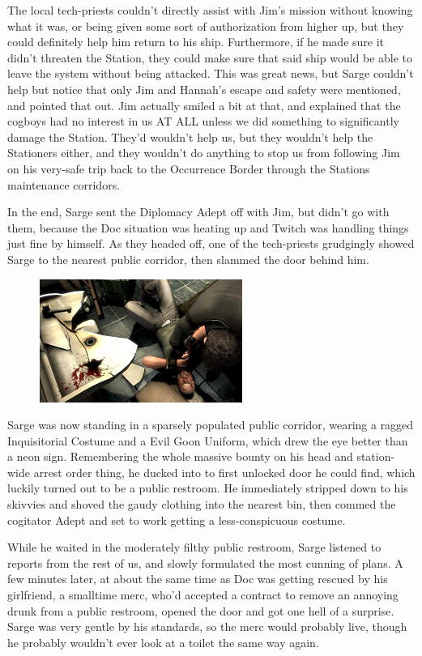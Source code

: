 The local tech-priests couldn't directly assist with Jim's mission without knowing what it was, or being given some sort of authorization from higher up, but they could definitely help him return to his ship. 
Furthermore, if he made sure it didn't threaten the Station, they could make sure that said ship would be able to leave the system without being attacked. 
This was great news, but Sarge couldn't help but notice that only Jim and Hannah's escape and safety were mentioned, and pointed that out. 
Jim actually smiled a bit at that, and explained that the cogboys had no interest in us AT ALL unless we did something to significantly damage the Station. 
They'd wouldn't help us, but they wouldn't help the Stationers either, and they wouldn't do anything to stop us from following Jim on his very-safe trip back to the Occurrence Border through the Stations maintenance corridors.

In the end, Sarge sent the Diplomacy Adept off with Jim, but didn't go with them, because the Doc situation was heating up and Twitch was handling things just fine by himself. 
As they headed off, one of the tech-priests grudgingly showed Sarge to the nearest public corridor, then slammed the door behind him.

\begin{figure}
	\begin{center}
		\includegraphics[width=\figwidth]{pics/14/43.png}
	\end{center}
\end{figure}
Sarge was now standing in a sparsely populated public corridor, wearing a ragged Inquisitorial Costume and a Evil Goon Uniform, which drew the eye better than a neon sign. 
Remembering the whole massive bounty on his head and station-wide arrest order thing, he ducked into to first unlocked door he could find, which luckily turned out to be a public restroom. 
He immediately stripped down to his skivvies and shoved the gaudy clothing into the nearest bin, then commed the cogitator Adept and set to work getting a less-conspicuous costume.

While he waited in the moderately filthy public restroom, Sarge listened to reports from the rest of us, and slowly formulated the most cunning of plans. 
A few minutes later, at about the same time as Doc was getting rescued by his girlfriend, a smalltime merc, who'd accepted a contract to remove an annoying drunk from a public restroom, opened the door and got one hell of a surprise. 
Sarge was very gentle by his standards, so the merc would probably live, though he probably wouldn't ever look at a toilet the same way again.

